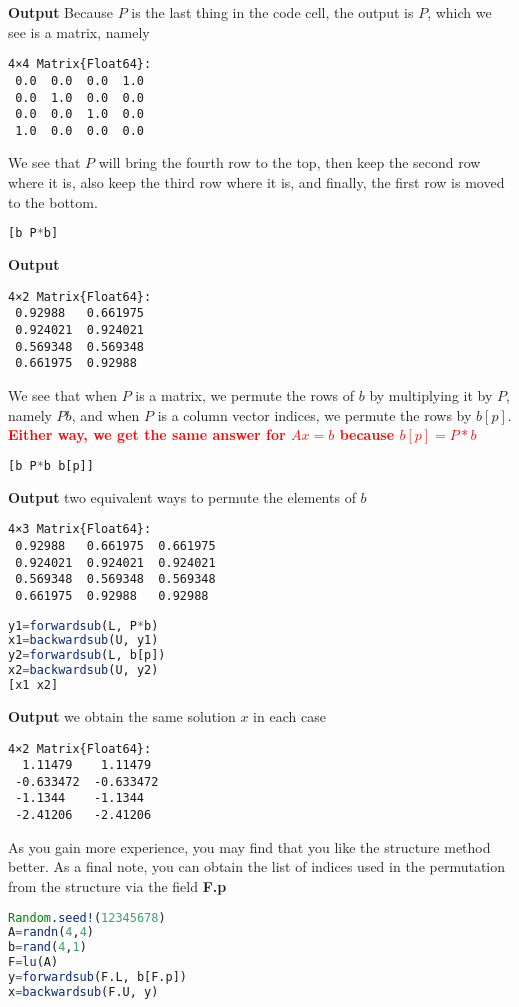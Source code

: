 \begin{itemize}
\textbf{Output} Because $P$ is the last thing in the code cell, the output is $P$, which we see is a matrix, namely
\begin{verbatim}
4×4 Matrix{Float64}:
 0.0  0.0  0.0  1.0
 0.0  1.0  0.0  0.0
 0.0  0.0  1.0  0.0
 1.0  0.0  0.0  0.0
\end{verbatim}
We see that $P$ will bring the fourth row to the top, then keep the second row where it is, also keep the third row where it is, and finally, the first row is moved to the bottom.
\begin{lstlisting}[language=Julia,style=mystyle]
[b P*b]
\end{lstlisting}
\textbf{Output}
\begin{verbatim}
4×2 Matrix{Float64}:
 0.92988   0.661975
 0.924021  0.924021
 0.569348  0.569348
 0.661975  0.92988
\end{verbatim}
We see that when $P$ is a matrix, we permute the rows of $b$ by multiplying it by $P$, namely $P b$,  and when $P$ is a column vector indices, we permute the rows by $b[p]$. \textcolor{red}{\bf Either way, we get the same answer for $Ax=b$ because $b[p] = P*b$}
\begin{lstlisting}[language=Julia,style=mystyle]
[b P*b b[p]]
\end{lstlisting}
\textbf{Output} two equivalent ways to permute the elements of $b$
\begin{verbatim}
4×3 Matrix{Float64}:
 0.92988   0.661975  0.661975
 0.924021  0.924021  0.924021
 0.569348  0.569348  0.569348
 0.661975  0.92988   0.92988
 \end{verbatim}
\begin{lstlisting}[language=Julia,style=mystyle]
y1=forwardsub(L, P*b)
x1=backwardsub(U, y1)
y2=forwardsub(L, b[p])
x2=backwardsub(U, y2)
[x1 x2]
\end{lstlisting}
\textbf{Output} we obtain the same solution $x$ in each case
\begin{verbatim}
4×2 Matrix{Float64}:
  1.11479    1.11479
 -0.633472  -0.633472
 -1.1344    -1.1344
 -2.41206   -2.41206
 \end{verbatim}
As you gain more experience, you may find that you like the structure method better. As a final note, you can obtain the list of indices used in the permutation from the structure via the field \textbf{F.p}
\begin{lstlisting}[language=Julia,style=mystyle]
Random.seed!(12345678)
A=randn(4,4)
b=rand(4,1)
F=lu(A)
y=forwardsub(F.L, b[F.p])
x=backwardsub(F.U, y)
\end{lstlisting}

\end{itemize}

